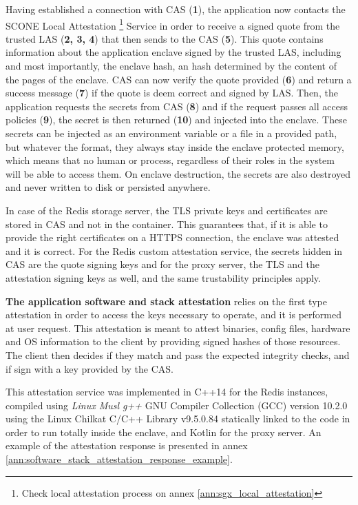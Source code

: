 Having established a connection with \gls{CAS} (\textbf{1}), the application now contacts the SCONE Local Attestation \footnote{Check local attestation process on annex \ref{ann:sgx_local_attestation}} Service in order to receive a signed quote from the trusted \gls{LAS} (\textbf{2, 3, 4}) that then sends to the \gls{CAS} (\textbf{5}). This quote contains information about the application enclave signed by the trusted \gls{LAS}, including and most importantly, the enclave hash, an hash determined by the content of the pages of the enclave. \gls{CAS} can now verify the quote provided (\textbf{6}) and return a success message (\textbf{7}) if the quote is deem correct and signed by \gls{LAS}. Then, the application requests the secrets from \gls{CAS} (\textbf{8}) and if the request passes all access policies (\textbf{9}), the secret is then returned (\textbf{10}) and injected into the enclave. These secrets can be injected as an environment variable or a file in a provided path, but whatever the format, they always stay inside the enclave protected memory, which means that no human or process, regardless of their roles in the system will be able to access them. On enclave destruction, the secrets are also destroyed and never written to disk or persisted anywhere. 

In case of the Redis storage server, the \gls{TLS} private keys and certificates are stored in \gls{CAS} and not in the container. This guarantees that, if it is able to provide the right certificates on a \gls{HTTPS} connection, the enclave was attested and it is correct. For the Redis custom attestation service, the secrets hidden in \gls{CAS} are the quote signing keys and for the proxy server, the \gls{TLS} and the attestation signing keys as well, and the same trustability principles apply.

\textbf{The application software and stack attestation} relies on the first type attestation in order to access the keys necessary to operate, and it is performed at user request. This attestation is meant to attest binaries, config files, hardware and \gls{OS} information to the client by providing signed hashes of those resources. The client then decides if they match and pass the expected integrity checks, and if sign with a key provided by the \gls{CAS}.

This attestation service was implemented in C++14 for the Redis instances, compiled using \textit{Linux Musl g++} GNU Compiler Collection (GCC) version 10.2.0 using the Linux Chilkat C/C++ Library v9.5.0.84 statically linked to the code in order to run totally inside the enclave, and Kotlin for the proxy server. An example of the attestation response is presented in annex \ref{ann:software_stack_attestation_response_example}.

